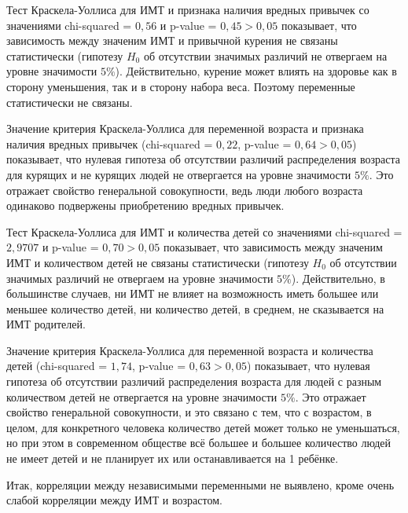 \documentclass[a4paper,12pt]{article}
\begin{document}
Тест Краскела-Уоллиса для ИМТ и признака наличия вредных привычек со значениями chi-squared = $0,56$ и p-value = $0,45 > 0,05$ показывает, что зависимость между значеним ИМТ и привычной курения не связаны статистически (гипотезу $H_0$ об отсутствии значимых различий не отвергаем на уровне значимости $5\%$). Действительно, курение может влиять на здоровье как в сторону уменьшения, так и в сторону набора веса. Поэтому переменные статистически не связаны.

Значение критерия Краскела-Уоллиса для переменной возраста и признака наличия вредных привычек (chi-squared = $0,22$, p-value = $0,64 > 0,05$) показывает, что нулевая гипотеза об отсутствии различий распределения возраста для курящих и не курящих людей не отвергается на уровне значимости $5\%$. Это отражает свойство генеральной совокупности, ведь люди любого возраста одинаково подвержены приобретению вредных привычек.


Тест Краскела-Уоллиса для ИМТ и количества детей со значениями chi-squared = $2,9707$ и p-value = $0,70 > 0,05$ показывает, что зависимость между значеним ИМТ и количеством детей не связаны статистически (гипотезу $H_0$ об отсутствии значимых различий не отвергаем на уровне значимости $5\%$). Действительно, в большинстве случаев, ни ИМТ не влияет на возможность иметь большее или меньшее количество детей, ни количество детей, в среднем, не сказывается на ИМТ родителей.

Значение критерия Краскела-Уоллиса для переменной возраста и количества детей (chi-squared = $1,74$, p-value = $0,63 > 0,05$) показывает, что нулевая гипотеза об отсутствии различий распределения возраста для людей с разным количеством детей не отвергается на уровне значимости $5\%$. Это отражает свойство генеральной совокупности, и это связано с тем, что с возрастом, в целом, для конкретного человека количество детей может только не уменьшаться, но при этом в современном обществе всё большее и большее количество людей не имеет детей и не планирует их или останавливается на 1 ребёнке.

Итак, корреляции между независимыми переменными не выявлено, кроме очень слабой корреляции между ИМТ и возрастом.
\end{document}
